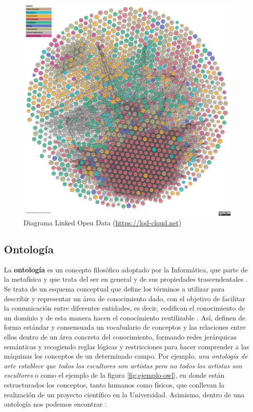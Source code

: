 \begin{figure}[H]
	\centering
	\includegraphics[width=1\linewidth]{imagenes/capitulo3/lod-cloud-sm}
	\caption{Diagrama Linked Open Data (\url{https://lod-cloud.net})}
	\label{fig:lod-cloud-sm}
\end{figure}





\subsection{Ontología} %

La \textbf{ontología} es un concepto filosófico adoptado por la Informática, que parte de la metafísica y que trata del ser en general y de sus propiedades trascendentales \cite{apuntes-clase-jose}. Se trata de un esquema conceptual que define los términos a utilizar para describir y representar un área de conocimiento dado, con el objetivo de facilitar la comunicación entre diferentes entidades, es decir, codifican el conocimiento de un dominio y de esta manera hacen el conocimiento reutilizable \cite{tesis}. Así, definen de forma estándar y consensuada un vocabulario de conceptos y las relaciones entre ellos dentro de un área concreta del conocimiento, formando redes jerárquicas semánticas y recogiendo reglas lógicas y restricciones para hacer comprender a las máquinas los conceptos de un determinado campo. Por ejemplo, \textit{una ontología de arte establece que todos los escultores son artistas pero no todos los artistas son escultores} \cite{web-semantica-w3c} o como el ejemplo de la figura \ref{fig:ejemplo-owl}, en donde están estructurados los conceptos, tanto humanos como físicos, que conllevan la realización de un proyecto científico en la Universidad. Asimismo, dentro de una ontología nos podemos encontrar \cite{aplicacion, apuntes-clase-jose}:

